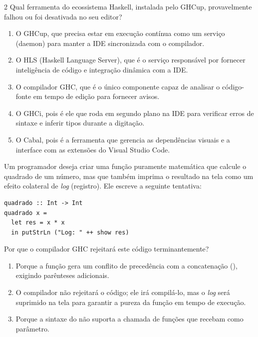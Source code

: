 \documentclass[a4paper,10pt,brazil]{article}
\begin{document}
\begin{multicols}{2}
Qual ferramenta do ecossistema Haskell, instalada pelo GHCup, provavelmente falhou ou foi desativada no seu editor?

\begin{enumerate}
  \item O GHCup, que precisa estar em execução contínua como um serviço (daemon) para manter a IDE sincronizada com o compilador.

  \item O HLS (Haskell Language Server), que é o serviço responsável por fornecer inteligência de código e integração dinâmica com a IDE.

  \item O compilador GHC, que é o único componente capaz de analisar o código-fonte em tempo de edição para fornecer avisos.

  \item O GHCi, pois é ele que roda em segundo plano na IDE para verificar erros de sintaxe e inferir tipos durante a digitação.

  \item O Cabal, pois é a ferramenta que gerencia as dependências visuais e a interface com as extensões do Visual Studio Code.


\end{enumerate}

Um programador deseja criar uma função puramente matemática que calcule o quadrado de um número, mas que também imprima o resultado na tela como um efeito colateral de \emph{log} (registro). Ele escreve a seguinte tentativa:

\begin{verbatim}
quadrado :: Int -> Int
quadrado x = 
  let res = x * x
  in putStrLn ("Log: " ++ show res)
\end{verbatim}

Por que o compilador GHC rejeitará este código terminantemente?

\begin{enumerate}
  \item Porque a função  gera um conflito de precedência com a concatenação (\haskellinline{++}), exigindo parênteses adicionais.

  \item O compilador não rejeitará o código; ele irá compilá-lo, mas o \emph{log} será suprimido na tela para garantir a pureza da função em tempo de execução.

  \item Porque a sintaxe do  não suporta a chamada de funções que recebam  como parâmetro.


\end{enumerate}
\end{multicols}
\end{document}

